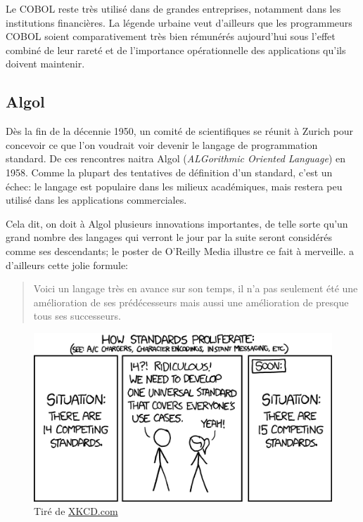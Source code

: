 Le COBOL reste très utilisé dans de grandes entreprises, notamment
dans les institutions financières. La légende urbaine veut d'ailleurs
que les programmeurs COBOL soient comparativement très bien rémunérés
aujourd'hui sous l'effet combiné de leur rareté et de l'importance
opérationnelle des applications qu'ils doivent maintenir.

\subsection{Algol}
\label{sec:informatique:historique:algol}

Dès la fin de la décennie 1950, un comité de scientifiques se réunit à
Zurich pour concevoir ce que l'on voudrait voir devenir le langage de
programmation standard. De ces rencontres naitra Algol
(\emph{ALGorithmic Oriented Language}) en 1958. Comme la plupart des
tentatives de définition d'un standard, c'est un échec: le langage est
populaire dans les milieux académiques, mais restera peu utilisé dans
les applications commerciales.

Cela dit, on doit à Algol plusieurs innovations importantes, de telle
sorte qu'un grand nombre des langages qui verront le jour par la suite
seront considérés comme ses descendants; le poster
 de O'Reilly Media illustre ce fait à
merveille. \citet{Hoare:1973} a d'ailleurs cette jolie formule:
\begin{quote}
  Voici un langage très en avance sur son temps, il n'a pas seulement
  été une amélioration de ses prédécesseurs mais aussi une
  amélioration de presque tous ses successeurs.
\end{quote}

\begin{figure}[t]
  \centering
  \begin{minipage}{0.9\linewidth}
    \includegraphics{standards} \\
    \footnotesize\sffamily%
    Tiré de \href{http://xkcd.com/927/}{XKCD.com}
  \end{minipage}
\end{figure}

